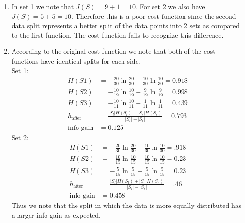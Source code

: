 \begin{Parts}
\begin{solution}
    \begin{enumerate}
        \item In set 1 we note that $J(S) = 9+1 = 10$. For set 2 we also have $J(S) = 5+5 = 10$. Therefore this is a poor cost function since the second data split represents a better split of the data points into 2 sets as compared to the first function. The cost function fails to recognize this difference.
        \item According to the original cost function we note that both of the cost functions have identical splits for each side. \\
          Set 1:\\
            \begin{align*}
H(S1) &= -\frac{20}{30} \ln \frac{20}{30} - \frac{10}{30} \ln \frac{10}{30} = 0.918 \\
H(S2) &= -\frac{10}{19} \ln \frac{10}{19} - \frac{9}{19} \ln \frac{9}{19} = 0.998 \\
H(S3) &= -\frac{10}{11} \ln \frac{10}{11} - \frac{1}{11} \ln \frac{1}{11} = 0.439 \\
h_{\text{after}} &= \frac{|S_l|H(S_l)+|S_r|H(S_r)}{|S_l| + |S_r|} = 0.793 \\
\text{info gain} &= 0.125
            \end{align*}
          Set 2:\\
            \begin{align*}
H(S1) &= -\frac{20}{30} \ln \frac{20}{30} - \frac{10}{30} \ln \frac{10}{30} = .918 \\
H(S2) &= -\frac{10}{15} \ln \frac{10}{15} - \frac{10}{15} \ln \frac{10}{15} = 0.23 \\
H(S3) &= -\frac{5}{15} \ln \frac{5}{15} - \frac{5}{15} \ln \frac{5}{15} = 0.23 \\
h_{\text{after}} &= \frac{|S_l|H(S_l)+|S_r|H(S_r)}{|S_l| + |S_r|} = .46 \\
\text{info gain} &= 0.458
            \end{align*}
          Thus we note that the split in which the data is more equally distributed has a larger info gain as expected.

    \end{enumerate}
\end{solution}


\end{Parts}
